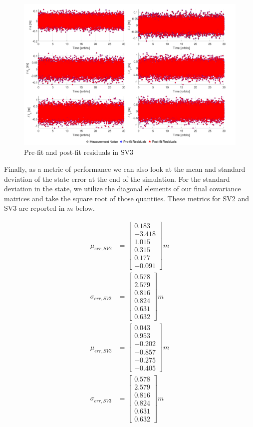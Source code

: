 \begin{figure}[H]
    \centering
    \includegraphics[width=0.7\linewidth]{sim/figures/PS8/residuals_SV3.png}
    \caption{Pre-fit and post-fit residuals in SV3}
    \label{fig:sv3_residuals}
\end{figure}

Finally, as a metric of performance we can also look at the mean and standard deviation of the state error at the end of the simulation. For the standard deviation in the state, we utilize the diagonal elements of our final covariance matrices and take the square root of those quantiies. These metrics for SV2 and SV3 are reported in $m$ below.


\begin{align}
    \mu_{err, SV2} &= \begin{bmatrix} 0.183 \\ -3.418 \\ 1.015 \\ 0.315 \\ 0.177 \\ -0.091 \end{bmatrix} m\\
    \sigma_{err, SV2} &= \begin{bmatrix} 0.578 \\ 2.579 \\ 0.816 \\ 0.824 \\ 0.631 \\ 0.632 \end{bmatrix} m\\
    \mu_{err, SV3} &= \begin{bmatrix} 0.043 \\ 0.953 \\ -0.202 \\ -0.857 \\ -0.275 \\ -0.405 \end{bmatrix} m\\
    \sigma_{err, SV3} &= \begin{bmatrix} 0.578 \\ 2.579 \\ 0.816 \\ 0.824 \\ 0.631 \\ 0.632 \end{bmatrix} m
\end{align}

